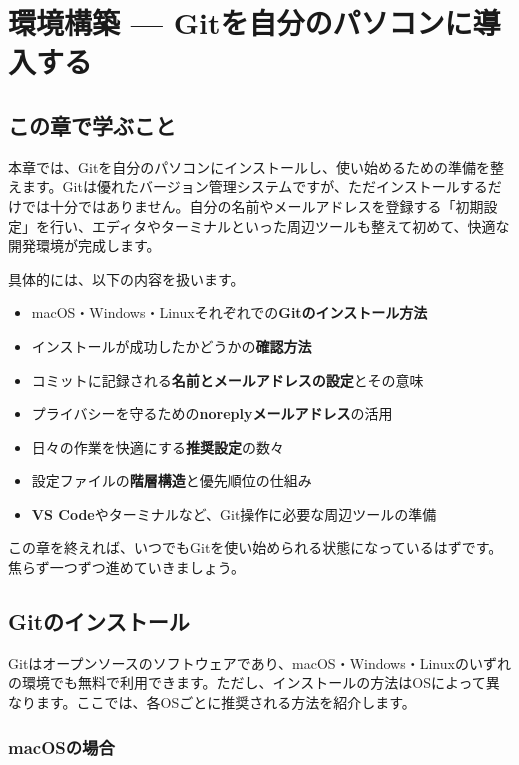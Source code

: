 \chapter{環境構築 — Gitを自分のパソコンに導入する}

\section{この章で学ぶこと}

本章では、Gitを自分のパソコンにインストールし、使い始めるための準備を整えます。Gitは優れたバージョン管理システムですが、ただインストールするだけでは十分ではありません。自分の名前やメールアドレスを登録する「初期設定」を行い、エディタやターミナルといった周辺ツールも整えて初めて、快適な開発環境が完成します。

具体的には、以下の内容を扱います。

\begin{itemize}
  \item macOS・Windows・Linuxそれぞれでの\textbf{Gitのインストール方法}
  \item インストールが成功したかどうかの\textbf{確認方法}
  \item コミットに記録される\textbf{名前とメールアドレスの設定}とその意味
  \item プライバシーを守るための\textbf{noreplyメールアドレス}の活用
  \item 日々の作業を快適にする\textbf{推奨設定}の数々
  \item 設定ファイルの\textbf{階層構造}と優先順位の仕組み
  \item \textbf{VS Code}やターミナルなど、Git操作に必要な周辺ツールの準備
\end{itemize}

この章を終えれば、いつでもGitを使い始められる状態になっているはずです。焦らず一つずつ進めていきましょう。

\section{Gitのインストール}

Gitはオープンソースのソフトウェアであり、macOS・Windows・Linuxのいずれの環境でも無料で利用できます。ただし、インストールの方法はOSによって異なります。ここでは、各OSごとに推奨される方法を紹介します。

\subsection{macOSの場合}

